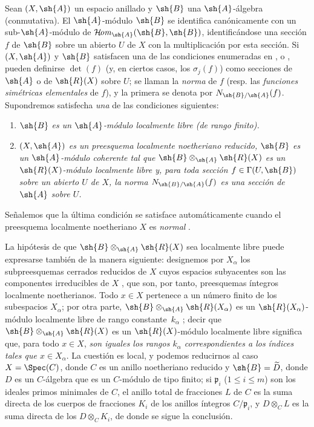 \documentclass[oneside,10pt]{amsart}
\renewcommand{\leq}{\leqslant}
\def\shHom{\mathcal{H}\!\mathit{om}}
\newcommand{\oldpage}[2][]{\marginnote{\normalfont\footnotesize\textbf{#1}~|~#2}\ignorespaces}
\let\EGAOriginalLabel\label
\renewcommand{\label}[1]{\phantomsection\EGAOriginalLabel{#1}}
\begin{document}
\begin{env}[6.5.1]
\label{II.6.5.1}
Sean $(X,\sh{A})$ un espacio anillado y $\sh{B}$ una $\sh{A}$-álgebra (conmutativa).
El $\sh{A}$-módulo $\sh{B}$ se identifica canónicamente con un sub-$\sh{A}$-módulo de $\shHom_{\sh{A}}(\sh{B},\sh{B})$, identificándose una sección $f$ de $\sh{B}$ sobre un abierto $U$ de $X$ con la multiplicación por esta sección.
Si $(X,\sh{A})$ y $\sh{B}$ satisfacen una de las condiciones enumeradas en ,  o , pueden definirse $\det(f)$ (y, en ciertos casos, los $\sigma_j(f)$) como secciones de $\sh{A}$ o de $\sh{R}(X)$ sobre $U$; se llaman la \emph{norma} de $f$ (resp. las \emph{funciones simétricas elementales} de $f$), y la primera se denota por $N_{\sh{B}/\sh{A}}(f)$.
Supondremos satisfecha \emph{una} de las condiciones siguientes:
\begin{enumerate}
  \item[{\rm(I)}] \emph{$\sh{B}$ es un $\sh{A}$-módulo localmente libre (de rango finito).}
  \item[{\rm(II)}] \emph{$(X,\sh{A})$ es un preesquema localmente noetheriano reducido, $\sh{B}$ es un $\sh{A}$-módulo coherente tal que $\sh{B}\otimes_{\sh{A}}\sh{R}(X)$ es un $\sh{R}(X)$-módulo localmente libre y, para toda sección $f\in\Gamma(U,\sh{B})$ sobre un abierto $U$ de $X$, la norma $N_{\sh{B}/\sh{A}}(f)$ es una sección de $\sh{A}$ sobre $U$.}
\end{enumerate}

\oldpage[II]{126}
Señalemos que la última condición se satisface automáticamente cuando el preesquema localmente noetheriano $X$ es \emph{normal} .

La hipótesis de que $\sh{B}\otimes_{\sh{A}}\sh{R}(X)$ sea localmente libre puede expresarse también de la manera siguiente: designemos por $X_\alpha$ los subpreesquemas cerrados reducidos de $X$ cuyos espacios subyacentes son las componentes irreducibles de $X$ , que son, por tanto, preesquemas íntegros localmente noetherianos.
Todo $x\in X$ pertenece a un número finito de los subespacios $X_\alpha$;
por otra parte, $\sh{B}\otimes_{\sh{A}}\sh{R}(X_\alpha)$ es un $\sh{R}(X_\alpha)$-módulo localmente libre de rango constante~$k_\alpha$ ;
decir que $\sh{B}\otimes_{\sh{A}}\sh{R}(X)$ es un $\sh{R}(X)$-módulo localmente libre significa que, para todo $x\in X$, \emph{son iguales los rangos $k_\alpha$ correspondientes a los índices tales que $x\in X_\alpha$}.
La cuestión es local, y podemos reducirnos al caso $X=\Spec(C)$, donde $C$ es un anillo noetheriano reducido y $\sh{B}=\widetilde{D}$, donde $D$ es un $C$-álgebra que es un $C$-módulo de tipo finito;
si $\mathfrak{p}_i$ ($1\leq i\leq m$) son los ideales primos minimales de $C$, el anillo total de fracciones $L$ de $C$ es la suma directa de los cuerpos de fracciones $K_i$ de los anillos íntegros $C/\mathfrak{p}_i$, y $D\otimes_C L$ es la suma directa de los $D\otimes_C K_i$, de donde se sigue la conclusión.


\end{env}
\end{document}
